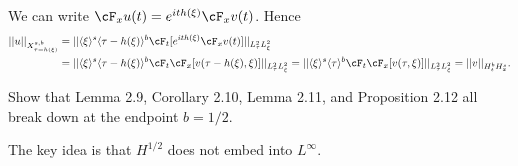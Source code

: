 \begin{solution}
	We can write $\cF_x u (t) = e^{i t h(\xi)} \cF_x v (t)$. Hence
		\begin{align*}
			||u||_{X^{s, b}_{\tau = h(\xi)}} 
				&= ||\langle \xi \rangle^s \langle \tau - h(\xi) \rangle^b \cF_t [e^{i t h(\xi)} \cF_x v (t)] ||_{L^2_\tau L^2_\xi} \\
				&	= ||\langle \xi \rangle^s \langle \tau - h(\xi) \rangle^b \cF_t \cF_x [v(\tau - h(\xi), \xi)]||_{L^2_\tau L^2_\xi} = ||\langle \xi \rangle^s \langle \tau \rangle^b \cF_t \cF_x [v(\tau, \xi)] ||_{L^2_\tau L^2_\xi} = ||v||_{H^b_t H^s_x}.
		\end{align*}
\end{solution}

\begin{statement}
	Show that Lemma 2.9, Corollary 2.10, Lemma 2.11, and Proposition 2.12 all break down at the endpoint $b = 1/2$. 
\end{statement}

\begin{solution}
	The key idea is that $H^{1/2}$ does not embed into $L^\infty$. 	
\end{solution}
